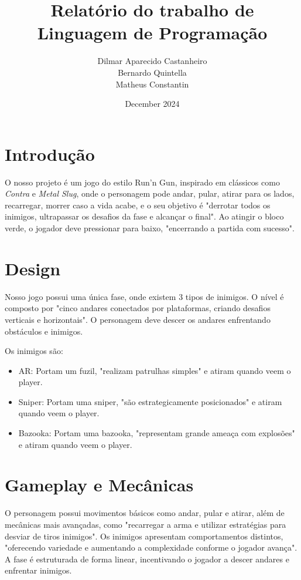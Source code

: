 \documentclass[a4paper]{article}
\title{Relatório do trabalho de Linguagem de Programação}
\author{Dilmar Aparecido Castanheiro \\
Bernardo Quintella \\ Matheus Constantin
}
\date{December 2024}
\begin{document}
\maketitle

\section{Introdução}

O nosso projeto é um jogo do estilo Run’n Gun, inspirado em clássicos como \textit{Contra} e \textit{Metal Slug}, onde o personagem pode andar, pular, atirar para os lados, recarregar, morrer caso a vida acabe, e o seu objetivo é "derrotar todos os inimigos, ultrapassar os desafios da fase e alcançar o final". Ao atingir o bloco verde, o jogador deve pressionar para baixo, "encerrando a partida com sucesso".

\section{Design}

Nosso jogo possui uma única fase, onde existem 3 tipos de inimigos. O nível é composto por "cinco andares conectados por plataformas, criando desafios verticais e horizontais". O personagem deve descer os andares enfrentando obstáculos e inimigos.

Os inimigos são:
\begin{itemize}
    \item AR: Portam um fuzil, "realizam patrulhas simples" e atiram quando veem o player.
    \item Sniper: Portam uma sniper, "são estrategicamente posicionados" e atiram quando veem o player.
    \item Bazooka: Portam uma bazooka, "representam grande ameaça com explosões" e atiram quando veem o player.
\end{itemize}

\section{Gameplay e Mecânicas}

O personagem possui movimentos básicos como andar, pular e atirar, além de mecânicas mais avançadas, como "recarregar a arma e utilizar estratégias para desviar de tiros inimigos". Os inimigos apresentam comportamentos distintos, "oferecendo variedade e aumentando a complexidade conforme o jogador avança". A fase é estruturada de forma linear, incentivando o jogador a descer andares e enfrentar inimigos.
\end{document}
